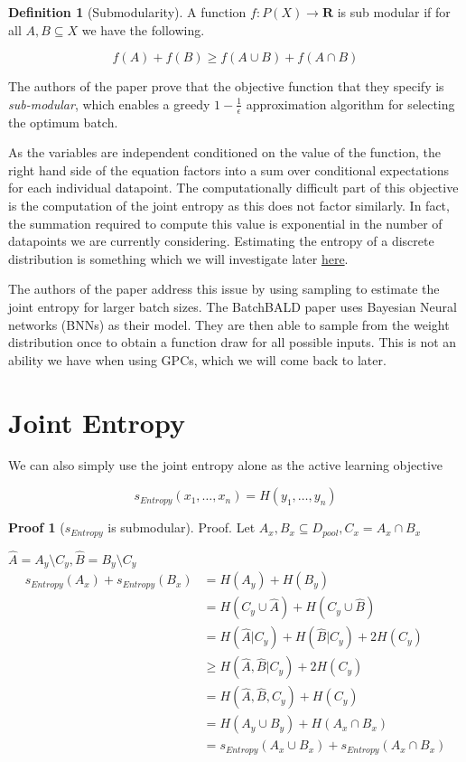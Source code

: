 \documentclass[12pt, a4paper]{report}
\theoremstyle{definition}
\theoremstyle{definition}
\newtheorem{definition}{Definition}[section]
\theoremstyle{definition}
\newtheorem{nproof}{Proof}[section]
\begin{document}
\begin{definition}[Submodularity]
    A function $f : P(X) \rightarrow \mathbf{R}$ is sub modular if for all $A,B \subseteq X$ we have the following.

    $$f(A) + f(B) \geq f\left( A \cup B \right) +  f\left(A \cap B \right) $$
\end{definition}

The authors of the paper prove that the objective function that they specify is \textit{sub-modular}, which enables a greedy $1 - \frac{1}{\epsilon}$ approximation algorithm for selecting the optimum batch.



As the variables are independent conditioned on the value of the function, the right hand side of the equation factors into a sum over conditional expectations for each individual datapoint. The computationally difficult part of this objective is the computation of the joint entropy as this does not factor similarly. In fact, the summation required to compute this value is exponential in the number of datapoints we are currently considering. Estimating the entropy of a discrete distribution is something which we will investigate later \hyperref[sec:Entropy]{here}.


The authors of the paper address this issue by using sampling to estimate the joint entropy for larger batch sizes. The BatchBALD paper uses Bayesian Neural networks (BNNs) as their model. They are then able to sample from the weight distribution once to obtain a function draw for all possible inputs. This is not an ability we have when using GPCs, which we will come back to later.


\section{Joint Entropy}

We can also simply use the joint entropy alone as the active learning objective

$$s_{Entropy} (x_1, \ldots, x_n) = H(y_1, \ldots, y_n)$$

\begin{nproof}[$s_{Entropy}$ is submodular]
    Proof.
    Let $A_x,B_x \subseteq D_{pool}, C_x = A_x \cap B_x$
    
    $\hat{A} = A_y \setminus C_y, \hat{B} = B_y \setminus C_y$
    \begin{align*}
        s_{Entropy} (A_x) + s_{Entropy} (B_x) &= H(A_y) + H(B_y)\\
        &= H(C_y \cup \hat{A}) + H(C_y \cup \hat{B})\\
        &= H(\hat{A} | C_y) + H(\hat{B} | C_y) + 2 H(C_y)\\
        &\geq H(\hat{A}, \hat{B} | C_y) + 2 H(C_y)\\
        &= H(\hat{A}, \hat{B}, C_y) + H(C_y)\\
        &= H(A_y \cup B_y) + H(A_x \cap B_x)\\
        &= s_{Entropy} (A_x \cup B_x) + s_{Entropy} (A_x \cap B_x)
    \end{align*}

\end{nproof}
\end{document}
